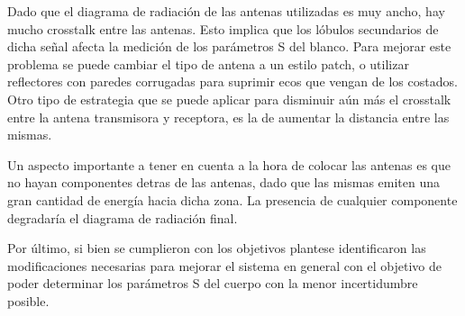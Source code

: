 Dado que el diagrama de radiación de las antenas utilizadas es muy ancho, hay mucho crosstalk entre las antenas. Esto implica que los lóbulos secundarios de dicha señal afecta la medición de los parámetros S del blanco. Para mejorar este problema se puede cambiar el tipo de antena a un estilo patch, o utilizar reflectores con paredes corrugadas para suprimir ecos que vengan de los costados. Otro tipo de estrategia que se puede aplicar para disminuir aún más el crosstalk entre la antena transmisora y receptora, es la de aumentar la distancia entre las mismas.

Un aspecto importante a tener en cuenta a la hora de colocar las antenas es que no hayan componentes detras de las antenas, dado que las mismas emiten una gran cantidad de energía hacia dicha zona. La presencia de cualquier componente degradaría el diagrama de radiación final.

Por último, si bien se cumplieron con los objetivos plantese identificaron las modificaciones necesarias para mejorar el sistema en general con el objetivo de poder determinar los parámetros S del cuerpo con la menor incertidumbre posible.
